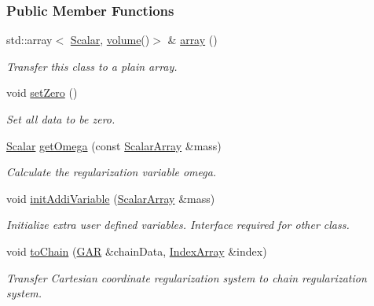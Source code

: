 \subsubsection*{Public Member Functions}
\begin{DoxyCompactItemize}
\item 
std\+::array$<$ \mbox{\hyperlink{class_g_a_r_a2ae44eda8e28d5dd26cf707dcda69314}{Scalar}}, \mbox{\hyperlink{class_g_a_r_abdbcc31db058125bd2ee207e7648b20b}{volume}}()$>$ \& \mbox{\hyperlink{class_g_a_r_a152aa5eea95fe568b010d85a7ba23bf7}{array}} ()
\begin{DoxyCompactList}\small\item\em Transfer this class to a plain array. \end{DoxyCompactList}\item 
void \mbox{\hyperlink{class_g_a_r_a3c59ee9bf8aae928644fa2beabbffa7c}{set\+Zero}} ()
\begin{DoxyCompactList}\small\item\em Set all data to be zero. \end{DoxyCompactList}\item 
\mbox{\hyperlink{class_g_a_r_a2ae44eda8e28d5dd26cf707dcda69314}{Scalar}} \mbox{\hyperlink{class_g_a_r_a3d5871f25d147497399fa65343bca84a}{get\+Omega}} (const \mbox{\hyperlink{class_g_a_r_a0b446684ae922457a3bf86c904085d8a}{Scalar\+Array}} \&mass)
\begin{DoxyCompactList}\small\item\em Calculate the regularization variable omega. \end{DoxyCompactList}\item 
void \mbox{\hyperlink{class_g_a_r_a31b5ad2527cc52d1422fa11e2d93fbc6}{init\+Addi\+Variable}} (\mbox{\hyperlink{class_g_a_r_a0b446684ae922457a3bf86c904085d8a}{Scalar\+Array}} \&mass)
\begin{DoxyCompactList}\small\item\em Initialize extra user defined variables. Interface required for other class. \end{DoxyCompactList}\item 
void \mbox{\hyperlink{class_g_a_r_a18041ac48dc47e6ada3e8a33893b1200}{to\+Chain}} (\mbox{\hyperlink{class_g_a_r}{G\+AR}} \&chain\+Data, \mbox{\hyperlink{class_g_a_r_aaf033049c0cd8f0f86a82b9595086fa5}{Index\+Array}} \&index)
\begin{DoxyCompactList}\small\item\em Transfer Cartesian coordinate regularization system to chain regularization system. \end{DoxyCompactList}\item 

\end{DoxyCompactItemize}
